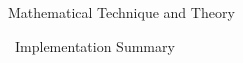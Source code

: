 \begin{chapter}{Mathematical Technique and Theory\label{chap:math}}
\begin{section}{\ALARA\  Implementation Summary}
  \end{section}
  
\end{chapter}

